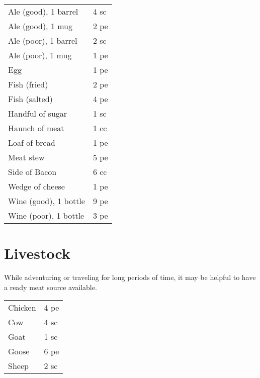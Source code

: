 \begin{center}
{
\begin{xtabular}{|l|l|}
Ale (good), 1 barrel & 4 sc \\
Ale (good), 1 mug & 2 pe \\
Ale (poor), 1 barrel & 2 sc \\
Ale (poor), 1 mug & 1 pe \\
Egg & 1 pe \\
Fish (fried) & 2 pe \\
Fish (salted) & 4 pe \\
Handful of sugar & 1 sc \\
Haunch of meat & 1 cc \\
Loaf of bread & 1 pe \\
Meat stew & 5 pe \\
Side of Bacon & 6 cc \\
Wedge of cheese & 1 pe \\
Wine (good), 1 bottle & 9 pe \\
Wine (poor), 1 bottle & 3 pe \\
\hline
\end{xtabular}
}
\end{center}

\section{Livestock}

While adventuring or traveling for long periods of time,
it may be helpful to have a ready meat source available.

\begin{center}
{
\begin{xtabular}{|l|l|}
Chicken & 4 pe \\
Cow & 4 sc \\
Goat & 1 sc \\
Goose & 6 pe \\
Sheep & 2 sc \\
\hline
\end{xtabular}
}
\end{center}


